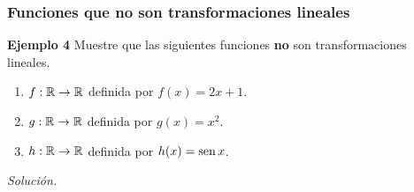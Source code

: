 \begin{frame}\frametitle{Funciones que no son transformaciones lineales}


\begin{ej}{\textbf{Ejemplo 4}}
	\justifying
	Muestre que las siguientes funciones \textbf{no} son transformaciones lineales.
	\begin{enumerate}
		\item[\labelname{$a$}] $f:\mathbb{R}\to \mathbb{R}$ definida por $f(x)=2x+1$.
		\item[\labelname{$b$}] $g:\mathbb{R}\to \mathbb{R}$ definida por $g(x)=x^2$.
		\item[\labelname{$c$}] $h:\mathbb{R}\to \mathbb{R}$ definida por $h(x)=\mathop{\mbox{\normalfont sen}}\nolimits x$.
	\end{enumerate}
\end{ej}
\textit{Solución.}

\end{frame}


\subsection{}

